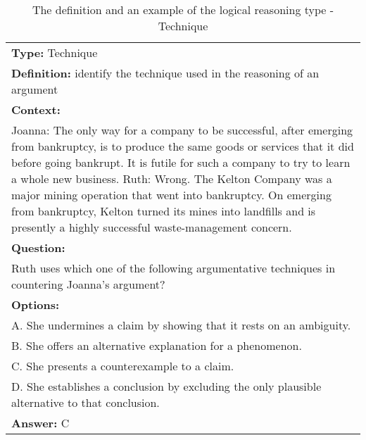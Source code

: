 \documentclass{article} \usepackage{iclr2020_conference,times}
\begin{document}
\begin{table}
	\small
	\centering
	\caption{The definition and an example of the logical reasoning type - Technique}
	\begin{tabular}{|p{}|}
		\hline
		{\bf Type: }Technique \\
		
		{\bf Definition: }identify the technique used in the reasoning of an argument
		\\
		\hline
		{\bf Context:} \\Joanna: The only way for a company to be successful, after emerging from bankruptcy, is to produce the same goods or services that it did before going bankrupt. It is futile for such a company to try to learn a whole new business. Ruth: Wrong. The Kelton Company was a major mining operation that went into bankruptcy. On emerging from bankruptcy, Kelton turned its mines into landfills and is presently a highly successful waste-management concern.
		\\
		{\bf Question:}\\Ruth uses which one of the following argumentative techniques in countering Joanna's argument?\\
		{\bf Options:}\\
			A. She undermines a claim by showing that it rests on an ambiguity.\\
			B. She offers an alternative explanation for a phenomenon.\\
			C. She presents a counterexample to a claim.\\
			D. She establishes a conclusion by excluding the only plausible alternative to that conclusion.\\
		{\bf Answer: }C \\
		\hline
	\end{tabular}
	\label{tab:technique}
\end{table}
\end{document}
